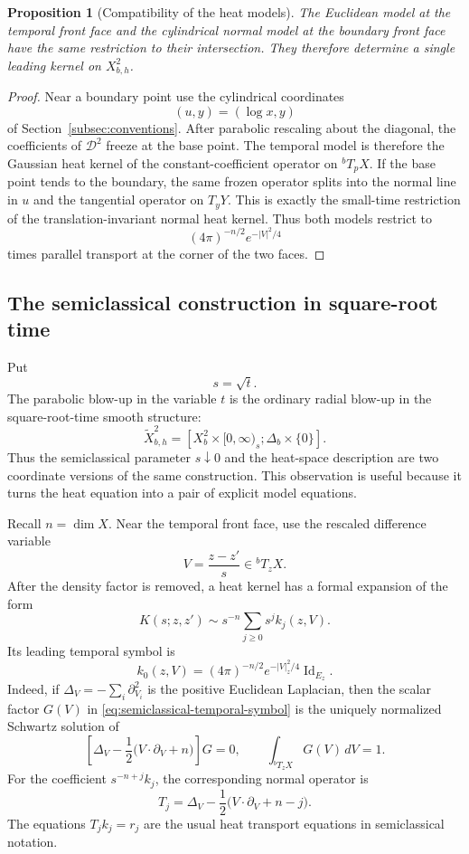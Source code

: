 \documentclass[12pt,oneside,reqno]{article}
\theoremstyle{plain}
\newtheorem{proposition}[theorem]{Proposition}
\theoremstyle{definition}
\theoremstyle{remark}
\begin{document}
\begin{proposition}[Compatibility of the heat models]
The Euclidean model at the temporal front face and the cylindrical normal
model at the boundary front face have the same restriction to their
intersection. They therefore determine a single leading kernel on
\(X_{b,h}^2\).
\end{proposition}

\begin{proof}
Near a boundary point use the cylindrical coordinates
\[
 (u,y)=(\log x,y)
\]
of Section~\ref{subsec:conventions}.
After parabolic rescaling about the diagonal, the coefficients of
\(\mathcal D^2\)
freeze at the base point. The temporal model is therefore the Gaussian
heat kernel of the constant-coefficient operator on
\({}^bT_pX\). If the base point tends to the boundary, the same frozen
operator splits into the normal line in \(u\) and the tangential operator
on \(T_yY\). This is exactly the small-time restriction of the
translation-invariant normal heat kernel. Thus both models restrict to
\[
 (4\pi)^{-n/2}e^{-|V|^2/4}
\]
times parallel transport at the corner of the two faces.
\end{proof}

\subsection{The semiclassical construction in square-root time}

Put
\[
 s=\sqrt t.
\]
The parabolic blow-up in the variable \(t\) is the ordinary radial blow-up
in the square-root-time smooth structure:
\[
 \widetilde X_{b,h}^2
 =
 \left[
 X_b^2\times[0,\infty)_s;
 \Delta_b\times\{0\}
 \right].
\]
Thus the semiclassical parameter \(s\downarrow0\) and the heat-space
description are two coordinate versions of the same construction.  This
observation is useful because it turns the heat equation into a pair of
explicit model equations.

Recall \(n=\dim X\).  Near the temporal front face, use the rescaled
difference variable
\[
 V=\frac{z-z'}s\in{}^bT_zX.
\]
After the density factor is removed, a heat kernel has a formal expansion
of the form
\[
 K(s;z,z')
 \sim
 s^{-n}\sum_{j\geq0}s^j k_j(z,V).
\]
Its leading temporal symbol is
\begin{equation}\label{eq:semiclassical-temporal-symbol}
 k_0(z,V)
 =
 (4\pi)^{-n/2}e^{-|V|_z^2/4}\operatorname{Id}_{E_z}.
\end{equation}
Indeed, if \(\Delta_V=-\sum_i\partial_{V_i}^2\) is the positive Euclidean
Laplacian, then the scalar factor \(G(V)\) in
\eqref{eq:semiclassical-temporal-symbol} is the uniquely normalized
Schwartz solution of
\[
 \left[
 \Delta_V-\frac12\bigl(V\mathbin{\cdot}\partial_V+n\bigr)
 \right]G=0,
 \qquad
 \int_{{}^bT_zX}G(V)\,dV=1.
\]
For the coefficient \(s^{-n+j}k_j\), the corresponding normal operator is
\[
 T_j
 =
 \Delta_V-\frac12\bigl(V\mathbin{\cdot}\partial_V+n-j\bigr).
\]
The equations \(T_jk_j=r_j\) are the usual heat transport equations in
semiclassical notation.
\end{document}
